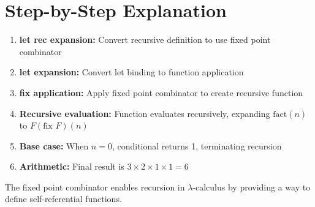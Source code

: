 \documentclass[12pt]{article}
\begin{document}
\section{Step-by-Step Explanation}

\begin{enumerate}
    \item \textbf{let rec expansion:} Convert recursive definition to use fixed point combinator
    \item \textbf{let expansion:} Convert let binding to function application  
    \item \textbf{fix application:} Apply fixed point combinator to create recursive function
    \item \textbf{Recursive evaluation:} Function evaluates recursively, expanding $\text{fact}(n)$ to $F(\text{fix } F)(n)$
    \item \textbf{Base case:} When $n=0$, conditional returns 1, terminating recursion
    \item \textbf{Arithmetic:} Final result is $3 \times 2 \times 1 \times 1 = 6$
\end{enumerate}

The fixed point combinator enables recursion in $\lambda$-calculus by providing a way to define self-referential functions.
\end{document}
